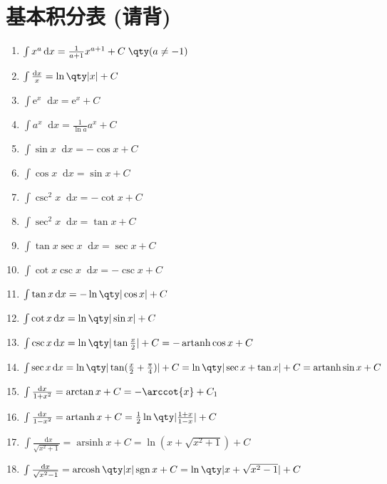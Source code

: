 \documentclass{ctexbook}
\DeclareMathOperator{\arsinh}{arsinh}
\DeclareMathOperator{\arcosh}{arcosh}
\DeclareMathOperator{\artanh}{artanh}
\DeclareMathOperator{\sgn}{sgn}
\newcommand{\e}{\mathrm{e}}
\newcommand*{\dif}{\mathop{}\!\mathrm{d}}
\begin{document}
{\section{基本积分表 (请背) }
\begin{enumerate}
\item$\int x^{a}\dif{x}=\frac{1}{a+1}x^{a+1}+C\;\qty(a\ne-1)$
\item$\int\frac{\dif{x}}{x}=\ln\qty|x|+C$
\item$\int\e^{x}\dif{x}=\e^{x}+C$
\item$\int a^{x}\dif{x}=\frac{1}{\ln{a}}a^{x}+C$
\item$\int\sin{x}\dif{x}=-\cos{x}+C$
\item$\int\cos{x}\dif{x}=\sin{x}+C$
\item$\int\csc^{2}{x}\dif{x}=-\cot{x}+C$
\item$\int\sec^{2}{x}\dif{x}=\tan{x}+C$
\item$\int\tan{x}\sec{x}\dif{x}=\sec{x}+C$
\item$\int\cot{x}\csc{x}\dif{x}=-\csc{x}+C$
\item$\int\tan{x}\dif{x}=-\ln\qty|\cos{x}|+C$
\item$\int\cot{x}\dif{x}=\ln\qty|\sin{x}|+C$
\item$\int\csc{x}\dif{x}=\ln\qty|\tan{\frac{x}{2}}|+C=-\artanh{\cos{x}}+C$
\item$\int\sec{x}\dif{x}=\ln\qty|\tan(\frac{x}{2}+\frac{\pi}{4})|+C=\ln\qty|\sec{x}+\tan{x}|+C=\artanh{\sin{x}}+C$
\item$\int\frac{\dif{x}}{1+x^{2}}=\arctan{x}+C=-\arccot{x}+C_{1}$
\item$\int\frac{\dif{x}}{1-x^{2}}=\artanh{x}+C=\frac{1}{2}\ln\qty|\frac{1+x}{1-x}|+C$
\item$\int\frac{\dif{x}}{\sqrt{x^{2}+1}}=\arsinh{x}+C=\ln(x+\sqrt{x^{2}+1})+C$
\item$\int\frac{\dif{x}}{\sqrt{x^{2}-1}}=\arcosh\qty|x|\sgn{x}+C=\ln\qty|x+\sqrt{x^{2}-1}|+C$
\end{enumerate}
}
\end{document}
